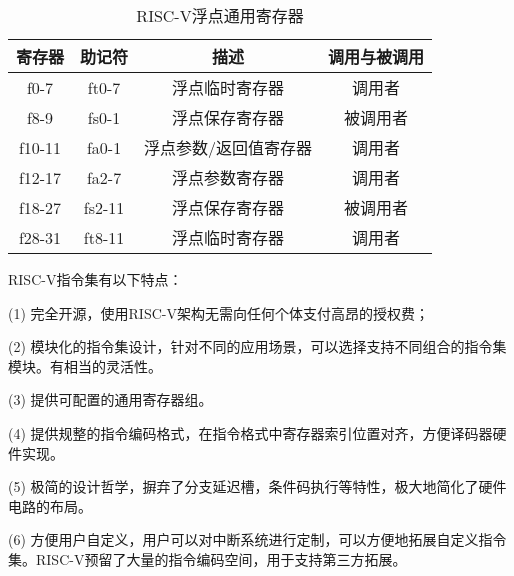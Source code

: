 \begin{table}[h]
  \centering
  \caption{RISC-V浮点通用寄存器}
  \label{tab:fpr}
  \begin{tabular}{cccc}
    \toprule
寄存器 &	助记符	& 描述 &	调用与被调用\\
    \midrule
    f0-7 & ft0-7 & 浮点临时寄存器 & 调用者\\
    f8-9 & fs0-1 & 浮点保存寄存器 & 被调用者\\
    f10-11 & fa0-1 & 浮点参数/返回值寄存器 & 调用者\\
    f12-17 & fa2-7 & 浮点参数寄存器 & 调用者\\
    f18-27 & fs2-11 & 浮点保存寄存器 & 被调用者\\
    f28-31 & ft8-11 & 浮点临时寄存器 & 调用者\\
    \bottomrule
  \end{tabular}
\end{table}


RISC-V指令集有以下特点：


(1) 完全开源，使用RISC-V架构无需向任何个体支付高昂的授权费；


(2) 模块化的指令集设计，针对不同的应用场景，可以选择支持不同组合的指令集模块。有相当的灵活性。


(3) 提供可配置的通用寄存器组。


(4) 提供规整的指令编码格式，在指令格式中寄存器索引位置对齐，方便译码器硬件实现。


(5) 极简的设计哲学，摒弃了分支延迟槽，条件码执行等特性，极大地简化了硬件电路的布局。


(6) 方便用户自定义，用户可以对中断系统进行定制，可以方便地拓展自定义指令集。RISC-V预留了大量的指令编码空间，用于支持第三方拓展。
















